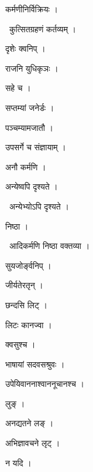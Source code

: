 \documentclass[10pt, openany, oneside]{book}
\begin{document}
\noindent कर्मणीनिर्विक्रियः ।

\par\noindent\hspace{1.5em}{\vps वा॰}~{\qt कुत्सितग्रहणं कर्तव्यम् ।}

\noindent दृशेः क्वनिप् ।

\noindent राजनि युधिकृञः ।

\noindent सहे च ।

\noindent सप्तम्यां जनेर्डः ।

\noindent पञ्चम्यामजातौ ।

\noindent उपसर्गे च संज्ञायाम् ।

\noindent अनौ कर्मणि ।

\noindent अन्येष्वपि दृश्यते ।

\par\noindent\hspace{1.5em}{\vps वा॰}~{\qt अन्येभ्योऽपि दृश्यते ।}

\noindent निष्ठा ।

\par\noindent\hspace{1.5em}{\vps वा॰}~{\qt आदिकर्मणि निष्ठा वक्तव्या ।}

\noindent सुयजोर्ङ्वनिप् ।

\noindent जीर्यतेरतृन् ।

\noindent छन्दसि लिट् ।

\noindent लिटः कानज्वा ।

\noindent क्वसुश्च ।

\noindent भाषायां सदवसश्रुवः ।

\noindent उपेयिवाननाश्वाननूचानश्च ।

\noindent लुङ् ।

\noindent अनद्यतने लङ् ।

\noindent अभिज्ञावचने लृट् ।

\noindent न यदि ।
\end{document}
